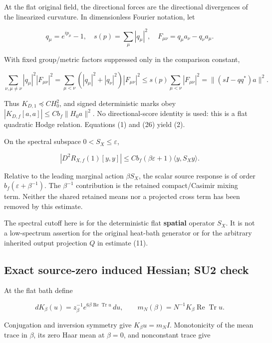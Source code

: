 \documentclass[
  11pt,
]{article}
\begin{document}
At the flat original field, the directional forces are the directional
divergences of the linearized curvature. In dimensionless Fourier
notation, let

\[
 q_\mu=e^{ip_\mu}-1,
 \quad s(p)=\sum_\mu|q_\mu|^2,
 \quad F_{\mu\nu}=q_\mu a_\nu-q_\nu a_\mu.
\]

With fixed group/metric factors suppressed only in the comparison
constant,

\[
\sum_{\nu,\mu\ne\nu}|q_\mu|^2|F_{\mu\nu}|^2
 =\sum_{\mu<\nu}(|q_\mu|^2+|q_\nu|^2)|F_{\mu\nu}|^2
 \le s(p)\sum_{\mu<\nu}|F_{\mu\nu}|^2
 =\|(sI-qq^*)a\|^2.                            \tag{31}
\]

Thus \(K_{D,1}\preceq CH_0^2\), and signed deterministic marks obey
\(|K_{D,f}[a,a]|\le Cb_f\|H_0a\|^2\). No directional-score identity is
used: this is a flat quadratic Hodge relation. Equations (1) and (26)
yield (2).

On the spectral subspace \(0<S_X\le\varepsilon\),

\[
 |D^2R_{X,f}(1)[y,y]|
 \le Cb_f(\beta\varepsilon+1)\langle y,S_Xy\rangle.
                                                        \tag{32}
\]

Relative to the leading marginal action \(\beta S_X\), the scalar source
response is of order \(b_f(\varepsilon+\beta^{-1})\). The \(\beta^{-1}\)
contribution is the retained compact/Casimir mixing term. Neither the
shared retained means nor a projected cross term has been removed by
this estimate.

The spectral cutoff here is for the deterministic flat \textbf{spatial}
operator \(S_X\). It is not a low-spectrum assertion for the original
heat-bath generator or for the arbitrary inherited output projection
\(Q\) in estimate (11).

\hypertarget{exact-source-zero-induced-hessian-su2-check}{%
\subsection{Exact source-zero induced Hessian; SU2
check}\label{exact-source-zero-induced-hessian-su2-check}}

At the flat bath define

\[
 dK_\beta(u)=z_\beta^{-1}e^{6\beta\operatorname{Re}\operatorname{Tr}u}\,du,
 \qquad m_N(\beta)=N^{-1}K_\beta\operatorname{Re}\operatorname{Tr}u.
\]

Conjugation and inversion symmetry give \(K_\beta u=m_NI\). Monotonicity
of the mean trace in \(\beta\), its zero Haar mean at \(\beta=0\), and
nonconstant trace give
\end{document}
